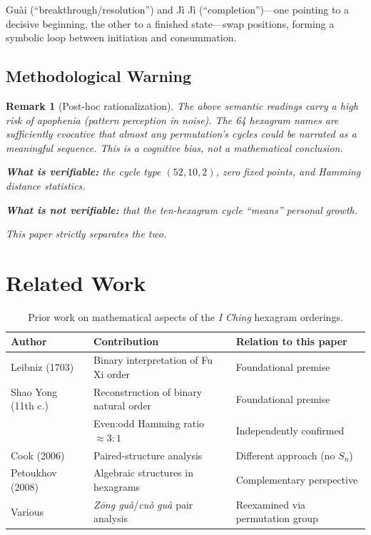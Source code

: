 \documentclass[11pt,a4paper]{article}
\newtheorem{remark}{Remark}
\begin{document}
Guài (``breakthrough/resolution'') and Jì Jì (``completion'')---one pointing to a decisive beginning, the other to a finished state---swap positions, forming a symbolic loop between initiation and consummation.

\subsection{Methodological Warning}

\begin{remark}[Post-hoc rationalization]\label{rem:posthoc}
  The above semantic readings carry a high risk of \emph{apophenia} (pattern perception in noise).
  The 64 hexagram names are sufficiently evocative that \emph{almost any} permutation's cycles could be narrated as a meaningful sequence.
  This is a cognitive bias, not a mathematical conclusion.

  \textbf{What is verifiable:} the cycle type $(52,10,2)$, zero fixed points, and Hamming distance statistics.

  \textbf{What is not verifiable:} that the ten-hexagram cycle ``means'' personal growth.

  This paper strictly separates the two.
\end{remark}


\section{Related Work}\label{sec:related}

\begin{table}[ht]
\centering
\caption{Prior work on mathematical aspects of the \textit{I Ching} hexagram orderings.}
\label{tab:related}
\begin{tabular}{@{}lll@{}}
\toprule
Author & Contribution & Relation to this paper \\
\midrule
Leibniz (1703) & Binary interpretation of Fu Xi order & Foundational premise \\
Shao Yong (11th c.) & Reconstruction of binary natural order & Foundational premise \\
\citet{moore} & Even:odd Hamming ratio $\approx 3\!:\!1$ & Independently confirmed \\
Cook (2006) & Paired-structure analysis & Different approach (no $S_n$) \\
Petoukhov (2008) & Algebraic structures in hexagrams & Complementary perspective \\
Various & \textit{Zōng guà}/\textit{cuò guà} pair analysis & Reexamined via permutation group \\
\bottomrule
\end{tabular}
\end{table}
\end{document}
